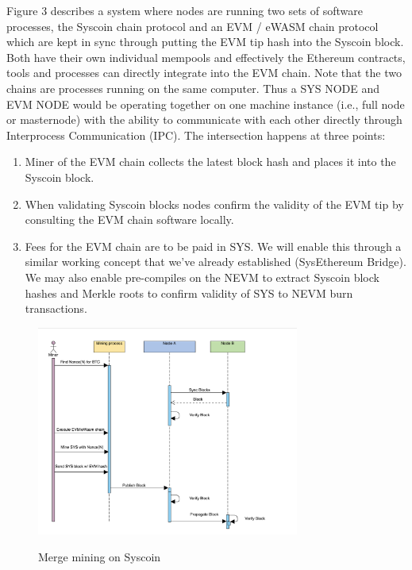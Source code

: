\documentclass[peerreview]{ieeesyscoin}
\begin{document}
Figure 3 describes a system where nodes are running two sets of software processes, the Syscoin chain protocol and an EVM / eWASM chain protocol which are kept in sync through putting the EVM tip hash into the Syscoin block. Both have their own individual mempools and effectively the Ethereum contracts, tools and processes can directly integrate into the EVM chain. Note that the two chains are processes running on the same computer. Thus a SYS NODE and EVM NODE would be operating together on one machine instance (i.e., full node or masternode) with the ability to communicate with each other directly through Interprocess Communication (IPC). The intersection happens at three points:

\begin{enumerate}
\item Miner of the EVM chain collects the latest block hash and places it into the Syscoin block.
\item When validating Syscoin blocks nodes confirm the validity of the EVM tip by consulting the EVM chain software locally.
\item Fees for the EVM chain are to be paid in SYS. We will enable this through a similar working concept that we’ve already established (SysEthereum Bridge). We may also enable pre-compiles on the NEVM to extract Syscoin block hashes and Merkle roots to confirm validity of SYS to NEVM burn transactions.
\end{enumerate}

\begin{figure}[h!]
\includegraphics[width=3.4in]{img/fig_6.png}
\label{fig:tech_stack}
\caption{Merge mining on Syscoin} 
\end{figure} 
\end{document}

